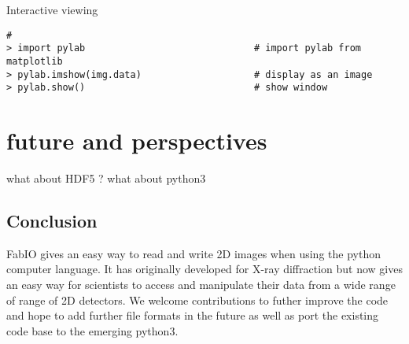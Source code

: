 \documentclass{iucr}
\begin{document}
Interactive viewing

\begin{verbatim}
#
> import pylab								# import pylab from matplotlib
> pylab.imshow(img.data)					# display as an image
> pylab.show()								# show window
\end{verbatim}





\section{future and perspectives}

what about HDF5 ? what about python3

\subsection{Conclusion}

FabIO gives an easy way to read and write 2D images when using the
python computer language.
It has originally developed for X-ray diffraction but now gives
an easy way for scientists to access and manipulate
their data from a wide range of range of 2D detectors.
We welcome contributions to futher improve the code and hope to add
further file formats in the future as well as port the existing code base to the emerging python3.
\end{document}
